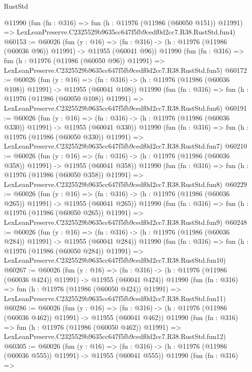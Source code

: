 \begin{lexlean}{RustStd}
\begin{coremodule}
    @11990
    (fun (fn : @316) =>
    fun (h : @11976 (@11986 (@60050 @151)) @11991) =>
    LexLeanPreserve.C2325529b9635cc647f5fb9cedf0d2cc7.R38.RustStd.fun4)
@60153 := @60026
    (fun (y : @16) =>
    (fn : @316) -> (h : @11976 (@11986 (@60036 @96)) @11991) -> @11955 (@60041 @96))
    @11990
    (fun (fn : @316) =>
    fun (h : @11976 (@11986 (@60050 @96)) @11991) =>
    LexLeanPreserve.C2325529b9635cc647f5fb9cedf0d2cc7.R38.RustStd.fun5)
@60172 := @60026
    (fun (y : @16) =>
    (fn : @316) -> (h : @11976 (@11986 (@60036 @108)) @11991) -> @11955 (@60041 @108))
    @11990
    (fun (fn : @316) =>
    fun (h : @11976 (@11986 (@60050 @108)) @11991) =>
    LexLeanPreserve.C2325529b9635cc647f5fb9cedf0d2cc7.R38.RustStd.fun6)
@60191 := @60026
    (fun (y : @16) =>
    (fn : @316) -> (h : @11976 (@11986 (@60036 @330)) @11991) -> @11955 (@60041 @330))
    @11990
    (fun (fn : @316) =>
    fun (h : @11976 (@11986 (@60050 @330)) @11991) =>
    LexLeanPreserve.C2325529b9635cc647f5fb9cedf0d2cc7.R38.RustStd.fun7)
@60210 := @60026
    (fun (y : @16) =>
    (fn : @316) -> (h : @11976 (@11986 (@60036 @358)) @11991) -> @11955 (@60041 @358))
    @11990
    (fun (fn : @316) =>
    fun (h : @11976 (@11986 (@60050 @358)) @11991) =>
    LexLeanPreserve.C2325529b9635cc647f5fb9cedf0d2cc7.R38.RustStd.fun8)
@60229 := @60026
    (fun (y : @16) =>
    (fn : @316) -> (h : @11976 (@11986 (@60036 @265)) @11991) -> @11955 (@60041 @265))
    @11990
    (fun (fn : @316) =>
    fun (h : @11976 (@11986 (@60050 @265)) @11991) =>
    LexLeanPreserve.C2325529b9635cc647f5fb9cedf0d2cc7.R38.RustStd.fun9)
@60248 := @60026
    (fun (y : @16) =>
    (fn : @316) -> (h : @11976 (@11986 (@60036 @284)) @11991) -> @11955 (@60041 @284))
    @11990
    (fun (fn : @316) =>
    fun (h : @11976 (@11986 (@60050 @284)) @11991) =>
    LexLeanPreserve.C2325529b9635cc647f5fb9cedf0d2cc7.R38.RustStd.fun10)
@60267 := @60026
    (fun (y : @16) =>
    (fn : @316) -> (h : @11976 (@11986 (@60036 @424)) @11991) -> @11955 (@60041 @424))
    @11990
    (fun (fn : @316) =>
    fun (h : @11976 (@11986 (@60050 @424)) @11991) =>
    LexLeanPreserve.C2325529b9635cc647f5fb9cedf0d2cc7.R38.RustStd.fun11)
@60286 := @60026
    (fun (y : @16) =>
    (fn : @316) -> (h : @11976 (@11986 (@60036 @462)) @11991) -> @11955 (@60041 @462))
    @11990
    (fun (fn : @316) =>
    fun (h : @11976 (@11986 (@60050 @462)) @11991) =>
    LexLeanPreserve.C2325529b9635cc647f5fb9cedf0d2cc7.R38.RustStd.fun12)
@60305 := @60026
    (fun (y : @16) =>
    (fn : @316) -> (h : @11976 (@11986 (@60036 @555)) @11991) -> @11955 (@60041 @555))
    @11990
    (fun (fn : @316) =>

\end{coremodule}
\end{lexlean}
